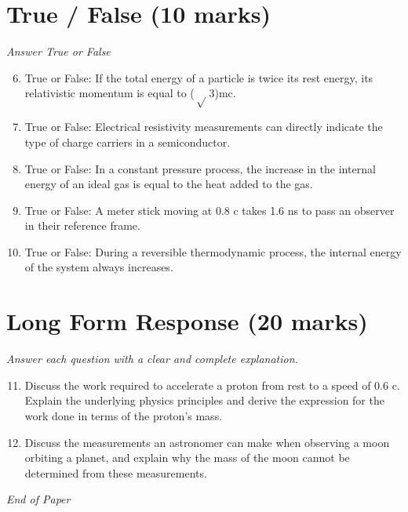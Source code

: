 \documentclass[12pt]{article}
\begin{document}
\section*{True / False (10 marks)}
\textit{Answer True or False}
\begin{enumerate}[label=\arabic*.]
\setcounter{enumi}{5}
\item True or False: If the total energy of a particle is twice its rest energy, its relativistic momentum is equal to (\ensuremath{\sqrt} 3)mc.
\item True or False: Electrical resistivity measurements can directly indicate the type of charge carriers in a semiconductor.
\item True or False: In a constant pressure process, the increase in the internal energy of an ideal gas is equal to the heat added to the gas.
\item True or False: A meter stick moving at 0.8 c takes 1.6 ns to pass an observer in their reference frame.
\item True or False: During a reversible thermodynamic process, the internal energy of the system always increases.
\end{enumerate}

\section*{Long Form Response (20 marks)}
\textit{Answer each question with a clear and complete explanation.}
\begin{enumerate}[label=\arabic*.]
\setcounter{enumi}{10}
\item Discuss the work required to accelerate a proton from rest to a speed of 0.6 c. Explain the underlying physics principles and derive the expression for the work done in terms of the proton's mass.
\item Discuss the measurements an astronomer can make when observing a moon orbiting a planet, and explain why the mass of the moon cannot be determined from these measurements.
\end{enumerate}

\vfill
\noindent\textit{End of Paper}
\end{document}
